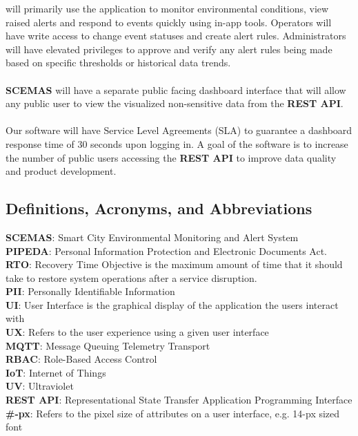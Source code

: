 \documentclass[]{article}
\begin{document}
will primarily use the application to monitor environmental conditions, view raised alerts and 
respond to events quickly using in-app tools. Operators will have write access to change event 
statuses and create alert rules. Administrators will have elevated privileges to approve and 
verify any alert rules being made based on specific thresholds or historical data trends.\\\\
\textbf{SCEMAS} will have a separate public facing dashboard interface that will allow any public user 
to view the visualized non-sensitive data from the \textbf{REST API}.\\\\
Our software will have Service Level Agreements (SLA) to guarantee a dashboard response time 
of 30 seconds upon logging in. A goal of the software is to increase the number of public users 
accessing the \textbf{REST API} to improve data quality and product development.

\subsection{Definitions, Acronyms, and Abbreviations}
\label{sub:definitions_acronyms_and_abbreviations}
\textbf{SCEMAS}: Smart City Environmental Monitoring and Alert System\\
\textbf{PIPEDA}: Personal Information Protection and Electronic Documents Act. 
\textbf{RTO}: Recovery Time Objective is the maximum amount of time that it should take to restore system operations after a service disruption.\\
\textbf{PII}: Personally Identifiable Information\\
\textbf{UI}: User Interface is the graphical display of the application the users interact with\\
\textbf{UX}: Refers to the user experience using a given user interface\\
\textbf{MQTT}: Message Queuing Telemetry Transport\\
\textbf{RBAC}: Role-Based Access Control\\
\textbf{IoT}: Internet of Things\\
\textbf{UV}: Ultraviolet\\
\textbf{REST API}: Representational State Transfer Application Programming Interface\\
\textbf{\#-px}: Refers to the pixel size of attributes on a user interface, e.g. 14-px sized font\\
\end{document}
